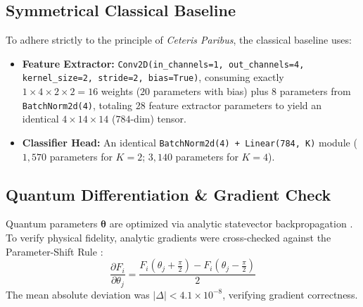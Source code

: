 \documentclass[journal]{IEEEtran}
\begin{document}
\subsection{Symmetrical Classical Baseline}
To adhere strictly to the principle of \textit{Ceteris Paribus}, the classical baseline uses:
\begin{itemize}
    \item \textbf{Feature Extractor:} \texttt{Conv2D(in\_channels=1, out\_channels=4, kernel\_size=2, stride=2, bias=True)}, consuming exactly $1 \times 4 \times 2 \times 2 = 16$ weights ($20$ parameters with bias) plus $8$ parameters from \texttt{BatchNorm2d(4)}, totaling $28$ feature extractor parameters to yield an identical $4 \times 14 \times 14$ ($784$-dim) tensor.
    \item \textbf{Classifier Head:} An identical \texttt{BatchNorm2d(4) + Linear(784, K)} module ($1{,}570$ parameters for $K=2$; $3{,}140$ parameters for $K=4$).
\end{itemize}

\begin{table}[t]
\caption{Parameter breakdown between feature extractors and classifier heads.}
\label{tab:params}
\centering
\footnotesize
{}
\end{table}

\subsection{Quantum Differentiation \& Gradient Check}
Quantum parameters $\boldsymbol{\theta}$ are optimized via analytic statevector backpropagation \cite{bergholm2018pennylane}. To verify physical fidelity, analytic gradients were cross-checked against the Parameter-Shift Rule \cite{schuld2019evaluating}:
\begin{equation}
\frac{\partial F_i}{\partial \theta_j} = \frac{F_i\left(\theta_j + \frac{\pi}{2}\right) - F_i\left(\theta_j - \frac{\pi}{2}\right)}{2}
\end{equation}
The mean absolute deviation was $|\Delta| < 4.1 \times 10^{-8}$, verifying gradient correctness.
\end{document}
